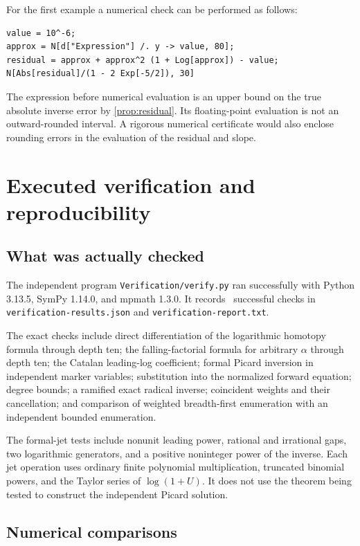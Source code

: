 \documentclass[11pt,a4paper]{article}
\theoremstyle{definition}
\theoremstyle{remark}
\newcommand{\code}[1]{\texttt{#1}}
\begin{document}
For the first example a numerical check can be performed as follows:
\begin{lstlisting}
value = 10^-6;
approx = N[d["Expression"] /. y -> value, 80];
residual = approx + approx^2 (1 + Log[approx]) - value;
N[Abs[residual]/(1 - 2 Exp[-5/2]), 30]
\end{lstlisting}
The expression before numerical evaluation is an upper bound on the true
absolute inverse error by \cref{prop:residual}. Its floating-point evaluation
is not an outward-rounded interval. A rigorous numerical certificate would
also enclose rounding errors in the evaluation of the residual and slope.

\section{Executed verification and reproducibility}
\label{sec:verification}

\subsection{What was actually checked}

The independent program \code{Verification/verify.py} ran successfully with
Python 3.13.5, SymPy 1.14.0, and mpmath 1.3.0. It records
\ successful checks in
\code{verification-results.json} and \code{verification-report.txt}.

The exact checks include direct differentiation of the logarithmic homotopy
formula through depth ten; the falling-factorial formula for arbitrary
$\alpha$ through depth ten; the Catalan leading-log coefficient; formal
Picard inversion in independent marker variables; substitution into the
normalized forward equation; degree bounds; a ramified exact radical inverse;
coincident weights and their cancellation; and comparison of weighted
breadth-first enumeration with an independent bounded enumeration.

The formal-jet tests include nonunit leading power, rational and irrational
gaps, two logarithmic generators, and a positive noninteger power of the
inverse. Each jet operation uses ordinary finite polynomial multiplication,
truncated binomial powers, and the Taylor series of $\log(1+U)$. It does not
use the theorem being tested to construct the independent Picard solution.

\subsection{Numerical comparisons}
\end{document}
